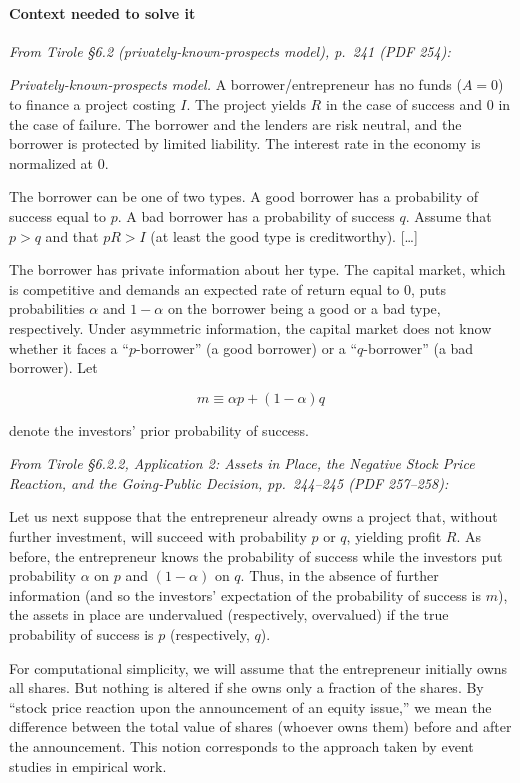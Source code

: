 \documentclass[11pt,a4paper]{article}
\begin{document}
\paragraph{Context needed to solve it}

\emph{From Tirole §6.2 (privately-known-prospects model), p.~241 (PDF 254):}

\emph{Privately-known-prospects model.} A borrower/entrepreneur has no funds (\(A = 0\)) to finance
a project costing \(I\). The project yields \(R\) in the case of success and 0 in the case of
failure. The borrower and the lenders are risk neutral, and the borrower is protected by limited
liability. The interest rate in the economy is normalized at 0.

The borrower can be one of two types. A good borrower has a probability of success equal to \(p\). A
bad borrower has a probability of success \(q\). Assume that \(p > q\) and that \(pR > I\) (at least
the good type is creditworthy). {[}\ldots{]}

The borrower has private information about her type. The capital market, which is competitive and
demands an expected rate of return equal to 0, puts probabilities \(\alpha\) and \(1 - \alpha\) on
the borrower being a good or a bad type, respectively. Under asymmetric information, the capital
market does not know whether it faces a ``\(p\)-borrower'' (a good borrower) or a ``\(q\)-borrower''
(a bad borrower). Let

\[m \equiv \alpha p + (1 - \alpha) q\]

denote the investors' prior probability of success.

\emph{From Tirole §6.2.2, Application 2: Assets in Place, the Negative Stock Price Reaction, and the
Going-Public Decision, pp.~244--245 (PDF 257--258):}

Let us next suppose that the entrepreneur already owns a project that, without further investment,
will succeed with probability \(p\) or \(q\), yielding profit \(R\). As before, the entrepreneur
knows the probability of success while the investors put probability \(\alpha\) on \(p\) and
\((1 - \alpha)\) on \(q\). Thus, in the absence of further information (and so the investors'
expectation of the probability of success is \(m\)), the assets in place are undervalued
(respectively, overvalued) if the true probability of success is \(p\) (respectively, \(q\)).

For computational simplicity, we will assume that the entrepreneur initially owns all shares. But
nothing is altered if she owns only a fraction of the shares. By ``stock price reaction upon the
announcement of an equity issue,'' we mean the difference between the total value of shares (whoever
owns them) before and after the announcement. This notion corresponds to the approach taken by event
studies in empirical work.
\end{document}
